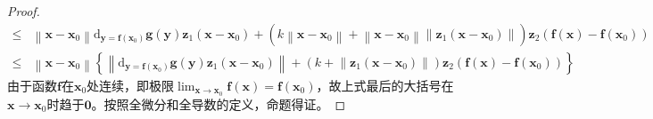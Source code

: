 \documentclass[main.tex]{subfiles}
\begin{document}
\begin{proof}
\begin{align*}
        \leq & \left\|\mathbf{x}-\mathbf{x}_0\right\|\mathrm{d}_{\mathbf{y}=\mathbf{f}\left(\mathbf{x}_0\right)}\mathbf{g}\left(\mathbf{y}\right)\mathbf{z}_1\left(\mathbf{x}-\mathbf{x}_0\right)+\left(k\left\|\mathbf{x}-\mathbf{x}_0\right\|+\left\|\mathbf{x}-\mathbf{x}_0\right\|\left\|\mathbf{z}_1\left(\mathbf{x}-\mathbf{x}_0\right)\right\|\right)\mathbf{z}_2\left(\mathbf{f}\left(\mathbf{x}\right)-\mathbf{f}\left(\mathbf{x}_0\right)\right) \\
        \leq & \left\|\mathbf{x}-\mathbf{x}_0\right\|\left\{\left\|\mathrm{d}_{\mathbf{y}=\mathbf{f}\left(\mathbf{x}_0\right)}\mathbf{g}\left(\mathbf{y}\right)\mathbf{z}_1\left(\mathbf{x}-\mathbf{x}_0\right)\right\|+\left(k+\left\|\mathbf{z}_1\left(\mathbf{x}-\mathbf{x}_0\right)\right\|\right)\mathbf{z}_2\left(\mathbf{f}\left(\mathbf{x}\right)-\mathbf{f}\left(\mathbf{x}_0\right)\right)\right\}
    \end{align*}
    由于函数$\mathbf{f}$在$\mathbf{x}_0$处连续，即极限$\lim_{\mathbf{x}\to\mathbf{x}_0}\mathbf{f}\left(\mathbf{x}\right)=\mathbf{f}\left(\mathbf{x}_0\right)$，故上式最后的大括号在$\mathbf{x}\to\mathbf{x}_0$时趋于$\mathbf{0}$。按照全微分和全导数的定义，命题得证。
\end{proof}
\end{document}
